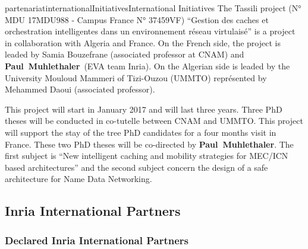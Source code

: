 \documentclass{ra2016}
\newcommand{\paul}             {\textbf{Paul~Muhlethaler}}
\begin{document}
\begin{module}{partenariat}{internationalInitiatives}{International Initiatives}
The Tassili project (N° MDU 17MDU988 - Campus France  N° 37459VF) ``Gestion des caches et orchestration intelligentes dans un environnement réseau virtulaisé'' is a project in collaboration with Algeria and France.
On the French side, the project is leaded by Samia Bouzefrane (associated professor at CNAM) and \paul~(EVA team Inria).
On the Algerian side is leaded by the University Mouloud Mammeri of Tizi-Ouzou (UMMTO) représented by Mehammed Daoui (associated professor).

This project will start in January 2017 and will last three years.
Three PhD theses will be conducted in co-tutelle between CNAM and UMMTO.
This project will support the stay of the tree PhD candidates for  a four months visit in France.
These two PhD theses will be co-directed by \paul.
The first subject is ``New intelligent caching and mobility strategies for MEC/ICN based architectures'' and the second subject concern the design of a safe  architecture for Name Data Networking.

\subsection{Inria International Partners}


\subsubsection{Declared Inria International Partners}


\end{module}
\end{document}
